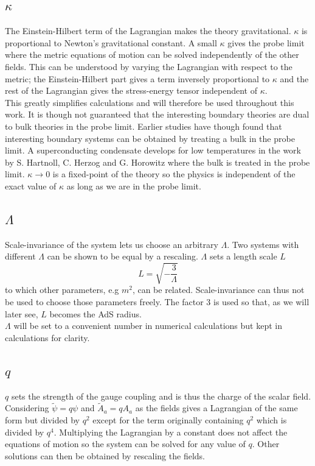 \documentclass[12pt]{report}
\begin{document}
\subsection{$\kappa$\label{s:kappa}}
The Einstein-Hilbert term of the Lagrangian makes the theory gravitational. $\kappa$ is proportional to Newton's gravitational constant. A small $\kappa$ gives the probe limit where the metric equations of motion can be solved independently of the other fields. This can be understood by varying the Lagrangian with respect to the metric; the Einstein-Hilbert part gives a term inversely proportional to $\kappa$ and the rest of the Lagrangian gives the stress-energy tensor independent of $\kappa$.\\

This greatly simplifies calculations and will therefore be used throughout this work. It is though not guaranteed that the interesting boundary theories are dual to bulk theories in the probe limit. Earlier studies have though found that interesting boundary systems can be obtained by treating a bulk in the probe limit. A superconducting condensate develops for low temperatures in the work by S. Hartnoll, C. Herzog and G. Horowitz \cite{hartnoll9} where the bulk is treated in the probe limit. $\kappa\rightarrow0$ is a fixed-point of the theory so the physics is independent of the exact value of $\kappa$ as long as we are in the probe limit.
\subsection{$\Lambda$}
Scale-invariance of the system lets us choose an arbitrary $\Lambda$. Two systems with different $\Lambda$ can be shown to be equal by a rescaling. $\Lambda$ sets a length scale $L$
\begin{equation}
L=\sqrt{-\frac{3}{\Lambda}}
\end{equation}
to which other parameters, e.g $m^2$, can be related. Scale-invariance can thus not be used to choose those parameters freely. The factor 3 is used so that, as we will later see, $L$ becomes the AdS radius.\\

$\Lambda$ will be set to a convenient number in numerical calculations but kept in calculations for clarity.
\subsection{$q$}
$q$ sets the strength of the gauge coupling and is thus the charge of the scalar field. Considering $\tilde{\psi}=q\psi$ and $\tilde{A}_a=qA_a$ as the fields gives a Lagrangian of the same form but divided by $q^2$ except for the term originally containing $q^2$ which is divided by $q^4$. Multiplying the Lagrangian by a constant does not affect the equations of motion so the system can be solved for any value of $q$. Other solutions can then be obtained by rescaling the fields.\\
\end{document}
